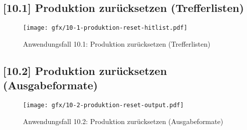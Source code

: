 \subsection{[10.1] Produktion zurücksetzen (Trefferlisten)}

\begin{figure}[H]
  \texttt{[image: gfx/10-1-produktion-reset-hitlist.pdf]}
  \caption{Anwendungsfall 10.1: Produktion zurücksetzen (Trefferlisten)}
  \label{fig:AF10-1}
\end{figure}

\subsection{[10.2] Produktion zurücksetzen (Ausgabeformate)}

\begin{figure}[H]
  \texttt{[image: gfx/10-2-produktion-reset-output.pdf]}
  \caption{Anwendungsfall 10.2: Produktion zurücksetzen (Ausgabeformate)}
  \label{fig:AF10-2}
\end{figure}
